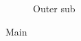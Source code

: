 \documentclass{article}
\begin{document}
\begin{figure}
\begin{subfigure}{0.4\textwidth}
\caption{Outer sub}
\end{subfigure}
\caption{Main}
\end{figure}
\end{document}
